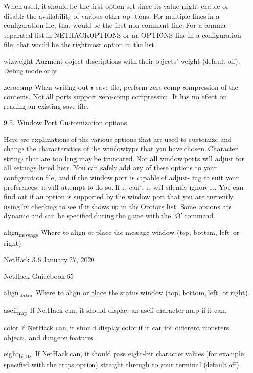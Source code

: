 \documentclass[11pt]{article}
\begin{document}
When used, it should be the first option set since its value
might enable or disable the availability of various other op-
tions. For multiple lines in a configuration file, that would
be the first non-comment line. For a comma-separated list in
NETHACKOPTIONS or an OPTIONS line in a configuration file, that
would be the rightmost option in the list.

wizweight
 Augment object descriptions with their objects' weight (default
 off). Debug mode only.

zerocomp
 When writing out a save file, perform zero-comp compression of
 the contents. Not all ports support zero-comp compression. It
 has no effect on reading an existing save file.

9.5. Window Port Customization options

   Here are explanations of the various options that are used
to customize and change the characteristics of the windowtype
that you have chosen. Character strings that are too long may be
truncated.  Not all window ports will adjust for all settings
listed here. You can safely add any of these options to your
configuration file, and if the window port is capable of adjust-
ing to suit your preferences, it will attempt to do so. If it
can't it will silently ignore it. You can find out if an option
is supported by the window port that you are currently using by
checking to see if it shows up in the Options list. Some options
are dynamic and can be specified during the game with the `O'
command.

align\textsubscript{message}
 Where to align or place the message window (top, bottom, left,
 or right)



NetHack 3.6                   January 27, 2020





NetHack Guidebook                       65



align\textsubscript{status}
 Where to align or place the status window (top, bottom, left,
 or right).

ascii\textsubscript{map}
 If NetHack can, it should display an ascii character map if it
 can.

color
 If NetHack can, it should display color if it can for different
 monsters, objects, and dungeon features.

eight\textsubscript{bit}\textsubscript{tty}
 If NetHack can, it should pass eight-bit character values (for
 example, specified with the traps option) straight through to
 your terminal (default off).
\end{document}
